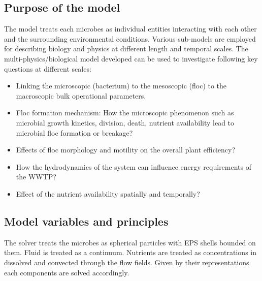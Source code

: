 \documentclass[11pt,a4paper,openright]{article}
\begin{document}
\subsection{Purpose of the model}

The model treats each microbes as individual entities interacting with each other and the surrounding environmental conditions. Various sub-models are employed for describing biology and physics at different length and temporal scales. 
The multi-physics/biological model developed can be used to investigate following key questions at different scales:

\begin{itemize}
\item Linking the microscopic (bacterium) to the mesoscopic (floc) to the macroscopic bulk operational parameters. 
\item Floc formation mechanism: How the microscopic phenomenon such as microbial growth kinetics, division, death, nutrient availability lead to microbial floc formation or breakage?
\item Effects of floc morphology and motility on the overall plant efficiency? 
\item How the hydrodynamics of the system can influence energy requirements of the WWTP?
\item Effect of the nutrient availability spatially and temporally?
\end{itemize}

\subsection{Model variables and principles}

The solver treats the microbes as spherical particles with EPS shells bounded on them. Fluid is treated as a continuum.
Nutrients are treated as concentrations in dissolved and convected through the flow fields. Given by their representations each components are solved accordingly. 
\end{document}
